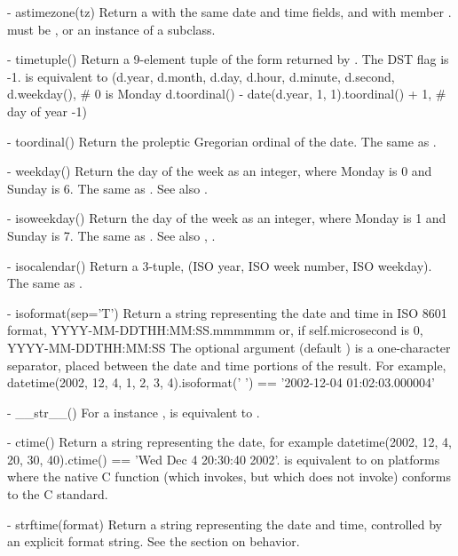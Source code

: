  - astimezone(tz)
    Return a  with the same date and time fields, and
    with  member .   must be ,
    or an instance of a  subclass.

  - timetuple()
    Return a 9-element tuple of the form returned by
    .
    The DST flag is -1.    is equivalent to
        (d.year, d.month, d.day,
         d.hour, d.minute, d.second,
         d.weekday(),  \# 0 is Monday
         d.toordinal() - date(d.year, 1, 1).toordinal() + 1, \# day of year
         -1)

  - toordinal()
    Return the proleptic Gregorian ordinal of the date.  The same as
    .

  - weekday()
    Return the day of the week as an integer, where Monday is 0 and
    Sunday is 6.  The same as .
    See also .

  - isoweekday()
    Return the day of the week as an integer, where Monday is 1 and
    Sunday is 7.  The same as .
    See also , .

  - isocalendar()
    Return a 3-tuple, (ISO year, ISO week number, ISO weekday).  The
    same as .

  - isoformat(sep='T')
    Return a string representing the date and time in ISO 8601 format,
        YYYY-MM-DDTHH:MM:SS.mmmmmm
    or, if self.microsecond is 0,
        YYYY-MM-DDTHH:MM:SS
    The optional argument  (default ) is a
    one-character separator, placed between the date and time portions
    of the result.  For example,
        datetime(2002, 12, 4, 1, 2, 3, 4).isoformat(' ') ==
        '2002-12-04 01:02:03.000004'

  - __str__()
    For a  instance ,  is
    equivalent to .

  - ctime()
    Return a string representing the date, for example
    datetime(2002, 12, 4, 20, 30, 40).ctime() == 'Wed Dec  4 20:30:40 2002'.
     is equivalent to
     on platforms where
    the native C  function (which
     invokes, but which
     does not invoke) conforms to the C
    standard.

  - strftime(format)
    Return a string representing the date and time, controlled by an
    explicit format string.  See the section on 
    behavior.


